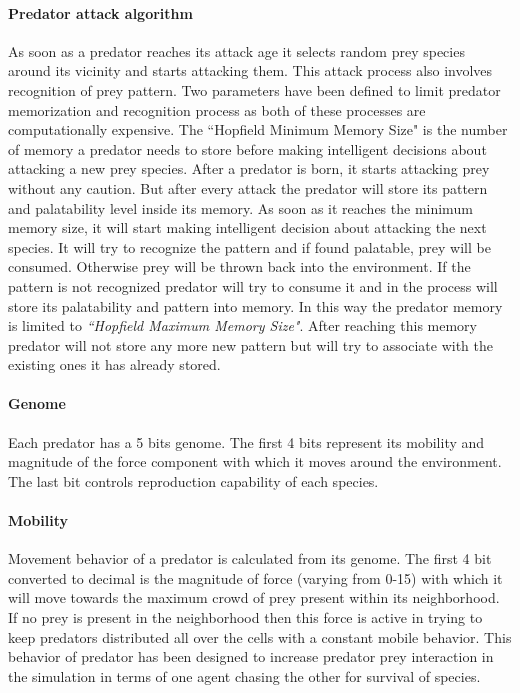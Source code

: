\documentclass[letterpaper]{article}
\numberwithin{equation}{section}
\begin{document}
\paragraph{Predator attack algorithm}
As soon as a predator reaches its attack age it selects random prey species around its vicinity and starts attacking them. This attack process also involves recognition of prey pattern. Two parameters have been defined to limit predator memorization and recognition process as both of these processes are computationally expensive. The ``Hopfield Minimum Memory Size" is the number of memory a predator needs to store before making intelligent decisions about attacking a new prey species. After a predator is born, it starts attacking prey without any caution. But after every attack the predator will store its pattern and palatability level inside its memory. As soon as it reaches the minimum memory size, it will start making intelligent decision about attacking the next species. It will try to recognize the pattern and if found palatable, prey will be consumed. Otherwise prey will be thrown back into the environment. If the pattern is not recognized predator will try to consume it and in the process will store its palatability and pattern into memory. In this way the predator memory is limited to \textsl{``Hopfield Maximum Memory Size"}. After reaching this memory predator will not store any more new pattern but will try to associate with the existing ones it has already stored.

\paragraph{Genome}
Each predator has a 5 bits genome. The first 4 bits represent its mobility and magnitude of the force component with which it moves around the environment. The last bit controls reproduction capability of each species.

\paragraph{Mobility}
Movement behavior of a predator is calculated from its genome. The first 4 bit converted to decimal is the magnitude of force (varying from 0-15) with which it will move towards the maximum crowd of prey present within its neighborhood. If no prey is present in the neighborhood then this force is active in trying to keep predators distributed all over the cells with a constant mobile behavior. This behavior of predator has been designed to increase predator prey interaction in the simulation in terms of one agent chasing the other for survival of species. 
\end{document}
